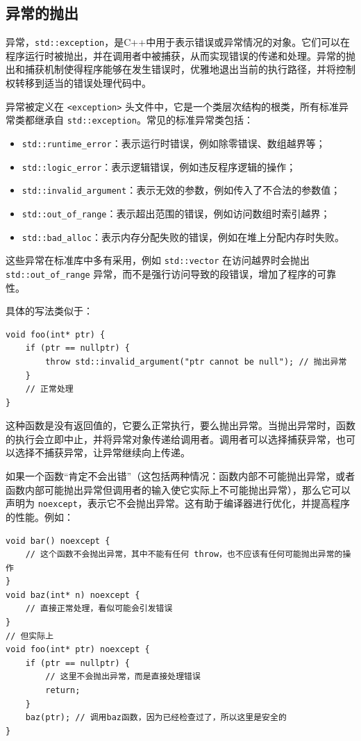 \subsection{异常的抛出}

异常，\texttt{std::exception}，是C++中用于表示错误或异常情况的对象。它们可以在程序运行时被抛出，并在调用者中被捕获，从而实现错误的传递和处理。异常的抛出和捕获机制使得程序能够在发生错误时，优雅地退出当前的执行路径，并将控制权转移到适当的错误处理代码中。

异常被定义在 \verb|<exception>| 头文件中，它是一个类层次结构的根类，所有标准异常类都继承自 \verb|std::exception|。常见的标准异常类包括：
\begin{itemize}
    \item \verb|std::runtime_error|：表示运行时错误，例如除零错误、数组越界等；
    \item \verb|std::logic_error|：表示逻辑错误，例如违反程序逻辑的操作；
    \item \verb|std::invalid_argument|：表示无效的参数，例如传入了不合法的参数值；
    \item \verb|std::out_of_range|：表示超出范围的错误，例如访问数组时索引越界；
    \item \verb|std::bad_alloc|：表示内存分配失败的错误，例如在堆上分配内存时失败。
\end{itemize}
这些异常在标准库中多有采用，例如 \verb|std::vector| 在访问越界时会抛出 \verb|std::out_of_range| 异常，而不是强行访问导致的段错误，增加了程序的可靠性。

具体的写法类似于：
\begin{verbatim}
void foo(int* ptr) {
    if (ptr == nullptr) {
        throw std::invalid_argument("ptr cannot be null"); // 抛出异常
    }
    // 正常处理
}
\end{verbatim}
这种函数是没有返回值的，它要么正常执行，要么抛出异常。当抛出异常时，函数的执行会立即中止，并将异常对象传递给调用者。调用者可以选择捕获异常，也可以选择不捕获异常，让异常继续向上传递。

如果一个函数“肯定不会出错”（这包括两种情况：函数内部不可能抛出异常，或者函数内部可能抛出异常但调用者的输入使它实际上不可能抛出异常），那么它可以声明为 \verb|noexcept|，表示它不会抛出异常。这有助于编译器进行优化，并提高程序的性能。例如：
\begin{verbatim}
void bar() noexcept {
    // 这个函数不会抛出异常，其中不能有任何 throw，也不应该有任何可能抛出异常的操作
}
void baz(int* n) noexcept {
    // 直接正常处理，看似可能会引发错误
}
// 但实际上
void foo(int* ptr) noexcept {
    if (ptr == nullptr) {
        // 这里不会抛出异常，而是直接处理错误
        return;
    }
    baz(ptr); // 调用baz函数，因为已经检查过了，所以这里是安全的
}
\end{verbatim}

